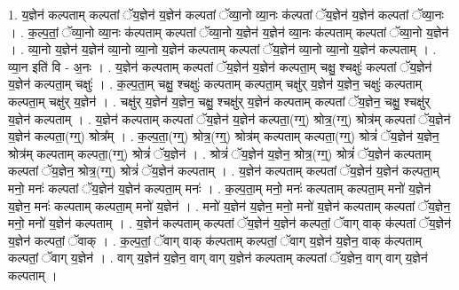 \documentclass[17pt]{extarticle}
\begin{document}
1. य॒ज्ञेन॑ कल्पताम् कल्पतां ॅय॒ज्ञेन॑ य॒ज्ञेन॑ कल्पतां ॅव्या॒नो व्या॒नः क॑ल्पतां ॅय॒ज्ञेन॑ य॒ज्ञेन॑ कल्पतां ॅव्या॒नः । . क॒ल्प॒तां॒ ॅव्या॒नो व्या॒नः क॑ल्पताम् कल्पतां ॅव्या॒नो य॒ज्ञेन॑ य॒ज्ञेन॑ व्या॒नः क॑ल्पताम् कल्पतां ॅव्या॒नो य॒ज्ञेन॑ । . व्या॒नो य॒ज्ञेन॑ य॒ज्ञेन॑ व्या॒नो व्या॒नो य॒ज्ञेन॑ कल्पताम् कल्पतां ॅय॒ज्ञेन॑ व्या॒नो व्या॒नो य॒ज्ञेन॑ कल्पताम् । . व्या॒न इति॑ वि - अ॒नः । . य॒ज्ञेन॑ कल्पताम् कल्पतां ॅय॒ज्ञेन॑ य॒ज्ञेन॑ कल्पता॒म् चक्षु॒ श्चक्षुः॑ कल्पतां ॅय॒ज्ञेन॑ य॒ज्ञेन॑ कल्पता॒म् चक्षुः॑ । . क॒ल्प॒ता॒म् चक्षु॒ श्चक्षुः॑ कल्पताम् कल्पता॒म् चक्षु॑र् य॒ज्ञेन॑ य॒ज्ञेन॒ चक्षुः॑ कल्पताम् कल्पता॒म् चक्षु॑र् य॒ज्ञेन॑ । . चक्षु॑र् य॒ज्ञेन॑ य॒ज्ञेन॒ चक्षु॒ श्चक्षु॑र् य॒ज्ञेन॑ कल्पताम् कल्पतां ॅय॒ज्ञेन॒ चक्षु॒ श्चक्षु॑र् य॒ज्ञेन॑ कल्पताम् । . य॒ज्ञेन॑ कल्पताम् कल्पतां ॅय॒ज्ञेन॑ य॒ज्ञेन॑ कल्पता॒(ग्ग्॒) श्रोत्र॒(ग्ग्॒) श्रोत्र॑म् कल्पतां ॅय॒ज्ञेन॑ य॒ज्ञेन॑ कल्पता॒(ग्ग्॒) श्रोत्र᳚म् । . क॒ल्प॒ता॒(ग्ग्॒) श्रोत्र॒(ग्ग्॒) श्रोत्र॑म् कल्पताम् कल्पता॒(ग्ग्॒) श्रोत्रं॑ ॅय॒ज्ञेन॑ य॒ज्ञेन॒ श्रोत्र॑म् कल्पताम् कल्पता॒(ग्ग्॒) श्रोत्रं॑ ॅय॒ज्ञेन॑ । . श्रोत्रं॑ ॅय॒ज्ञेन॑ य॒ज्ञेन॒ श्रोत्र॒(ग्ग्॒) श्रोत्रं॑ ॅय॒ज्ञेन॑ कल्पताम् कल्पतां ॅय॒ज्ञेन॒ श्रोत्र॒(ग्ग्॒) श्रोत्रं॑ ॅय॒ज्ञेन॑ कल्पताम् । . य॒ज्ञेन॑ कल्पताम् कल्पतां ॅय॒ज्ञेन॑ य॒ज्ञेन॑ कल्पता॒म् मनो॒ मनः॑ कल्पतां ॅय॒ज्ञेन॑ य॒ज्ञेन॑ कल्पता॒म् मनः॑ । . क॒ल्प॒ता॒म् मनो॒ मनः॑ कल्पताम् कल्पता॒म् मनो॑ य॒ज्ञेन॑ य॒ज्ञेन॒ मनः॑ कल्पताम् कल्पता॒म् मनो॑ य॒ज्ञेन॑ । . मनो॑ य॒ज्ञेन॑ य॒ज्ञेन॒ मनो॒ मनो॑ य॒ज्ञेन॑ कल्पताम् कल्पतां ॅय॒ज्ञेन॒ मनो॒ मनो॑ य॒ज्ञेन॑ कल्पताम् । . य॒ज्ञेन॑ कल्पताम् कल्पतां ॅय॒ज्ञेन॑ य॒ज्ञेन॑ कल्पतां॒ ॅवाग् वाक् क॑ल्पतां ॅय॒ज्ञेन॑ य॒ज्ञेन॑ कल्पतां॒ ॅवाक् । . क॒ल्प॒तां॒ ॅवाग् वाक् क॑ल्पताम् कल्पतां॒ ॅवाग् य॒ज्ञेन॑ य॒ज्ञेन॒ वाक् क॑ल्पताम् कल्पतां॒ ॅवाग् य॒ज्ञेन॑ । . वाग् य॒ज्ञेन॑ य॒ज्ञेन॒ वाग् वाग् य॒ज्ञेन॑ कल्पताम् कल्पतां ॅय॒ज्ञेन॒ वाग् वाग् य॒ज्ञेन॑ कल्पताम् । \newline
\end{document}
